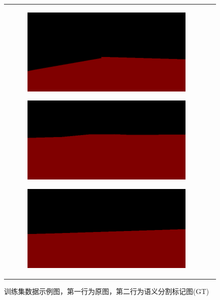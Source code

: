 \documentclass[cn,12pt,color=mine,scheme=chinese,bibstyle=gb7714-2015]{elegantbook}
\begin{document}
\begin{figure}[!htp]
\begin{tabular}{cc}
\begin{subfigure}[b]{0.23\linewidth}
			\caption{\label{fig:a}}
		\end{subfigure}
		\begin{subfigure}[b]{0.23\linewidth}
			\centering\includegraphics[width=\linewidth]{results/train2gt}\caption{\label{fig:b}}
		\end{subfigure}
		\begin{subfigure}[b]{0.23\linewidth}
			\centering\includegraphics[width=\linewidth]{results/train3gt}\caption{\label{fig:c}}
		\end{subfigure}
		\begin{subfigure}[b]{0.23\linewidth}
			\centering\includegraphics[width=\linewidth]{results/train4gt}\caption{\label{fig:d}}
		\end{subfigure}
	\end{tabular}
	\caption{训练集数据示例图，第一行为原图，第二行为语义分割标记图(GT)}
	\label{train}
\end{figure}
\end{document}
